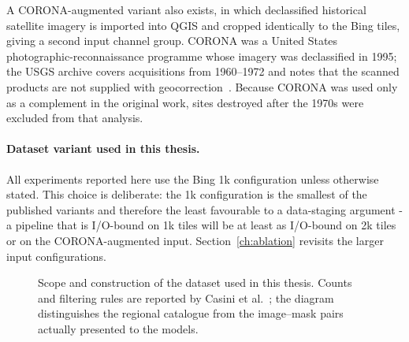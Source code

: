 A CORONA-augmented variant also exists, in which declassified historical satellite
imagery is imported into QGIS and cropped identically to the Bing tiles, giving a
second input channel group.
CORONA was a United States photographic-reconnaissance programme whose imagery was
declassified in 1995; the USGS archive covers acquisitions from 1960--1972 and
notes that the scanned products are not supplied with geocorrection~\cite{USGSCorona}.
Because CORONA was used only as a complement in the original work, sites destroyed
after the 1970s were excluded from that analysis.

\paragraph{Dataset variant used in this thesis.}
All experiments reported here use the Bing 1k configuration unless otherwise stated.
This choice is deliberate: the 1k configuration is the smallest of the published
variants and therefore the least favourable to a data-staging argument - a
pipeline that is I/O-bound on 1k tiles will be at least as I/O-bound on 2k tiles or
on the CORONA-augmented input.
Section~\ref{ch:ablation} revisits the larger input configurations.

\begin{figure}[!ht]
\centering
{}
\caption[Scope and construction of the segmentation dataset]{Scope and
construction of the dataset used in this thesis. Counts and filtering rules are
reported by Casini et al.~\cite{Casini23}; the diagram distinguishes the regional
catalogue from the image--mask pairs actually presented to the models.}
\label{fig:dataset-scope}
\end{figure}

